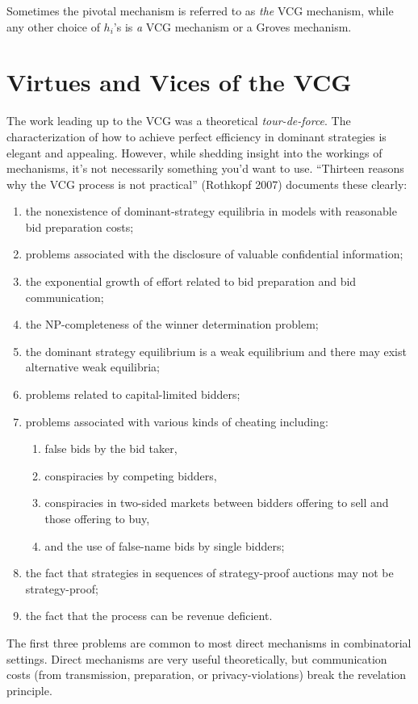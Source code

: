 \documentclass[letter, 10pt]{article}
\theoremstyle{basic}
\begin{document}
\begin{spacing}{1.0}
Sometimes the pivotal mechanism is referred to as \emph{the} VCG mechanism,
while any other choice of $h_i$'s is \emph{a} VCG mechanism or a Groves
mechanism.

\section{Virtues and Vices of the VCG}
\label{sec:virtues-vcg}

The work leading up to the VCG was a theoretical
\emph{tour-de-force}. The characterization of how to achieve
perfect efficiency in dominant strategies is elegant and
appealing. However, while shedding insight into the workings of mechanisms,
it's not necessarily something you'd want to use. ``Thirteen reasons why the
VCG process is not practical'' (Rothkopf 2007) documents these clearly:
\begin{enumerate}
\item the nonexistence of dominant-strategy equilibria in models with reasonable bid preparation costs;
\item problems associated with the disclosure of valuable confidential
  information;
\item the exponential growth of effort related to bid preparation and bid
  communication;
\item the NP-completeness of the winner determination problem;
\item the dominant strategy equilibrium is a weak equilibrium and there may
  exist alternative weak equilibria;
\item problems related to capital-limited bidders;
\item problems associated with various kinds of cheating
  including:
  \begin{enumerate}
  \item false bids by the bid taker,
  \item conspiracies by competing bidders,
  \item conspiracies in two-sided markets between bidders offering
    to sell and those offering to buy,
  \item  and the use of false-name bids by single bidders;
  \end{enumerate}
\item the fact that strategies in sequences of strategy-proof auctions may
  not be strategy-proof;
\item the fact that the process can be revenue deficient.
\end{enumerate}
The first three problems are common to most direct mechanisms in
combinatorial settings. Direct mechanisms are very useful theoretically,
but communication costs (from transmission, preparation, or
privacy-violations) break the revelation principle.


\end{spacing}
\end{document}
